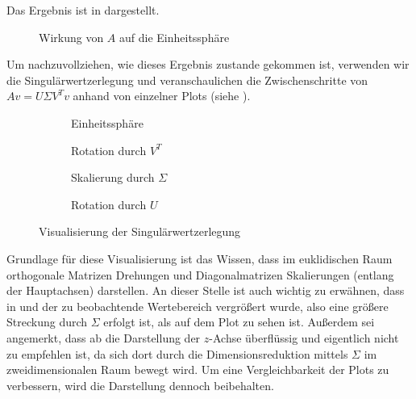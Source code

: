 Das Ergebnis ist in  dargestellt. 
\begin{figure}[htb]
    \centering
    \begin{subfigure}{0.45\textwidth}
        \centering
        
    \end{subfigure}
    \begin{subfigure}{0.45\textwidth}
        \centering
        
    \end{subfigure}
    \caption{Wirkung von \(A\) auf die Einheitssphäre}\label{fig:sph}
\end{figure}
Um nachzuvollziehen, wie dieses Ergebnis zustande gekommen ist, verwenden wir die Singulärwertzerlegung und veranschaulichen die Zwischenschritte von \(Av = U \Sigma V^{T}v\) anhand von einzelner Plots (siehe ). 
\begin{figure}[!b]
    \centering
    \captionsetup[subfigure]{justification=centering}
    \begin{subfigure}{0.45\textwidth}
        \centering
        \caption{Einheitssphäre}\label{fig:svspha}
        
    \end{subfigure}
    \begin{subfigure}{0.45\textwidth}
        \centering
        \caption{Rotation durch \(V^{T}\)}\label{fig:svsphb}
        
    \end{subfigure}
    \begin{subfigure}{0.45\textwidth}
        \centering
        \caption{Skalierung durch \(\Sigma\)}\label{fig:svdsphc}
        
    \end{subfigure}
    \begin{subfigure}{0.45\textwidth}
        \centering
        \caption{Rotation durch \(U\)}\label{fig:svdsphd}
        
    \end{subfigure}
    \caption{Visualisierung der Singulärwertzerlegung}\label{fig:svdsph}
\end{figure}

Grundlage für diese Visualisierung ist das Wissen, dass im euklidischen Raum orthogonale Matrizen Drehungen und Diagonalmatrizen Skalierungen (entlang der Hauptachsen) darstellen.
An dieser Stelle ist auch wichtig zu erwähnen, dass in  und  der zu beobachtende Wertebereich vergrößert wurde, also eine größere Streckung durch \(\Sigma\) erfolgt ist, als auf dem Plot zu sehen ist.
Außerdem sei angemerkt, dass ab  die Darstellung der \(z\)-Achse überflüssig und eigentlich nicht zu empfehlen ist, da sich dort durch die Dimensionsreduktion mittels \(\Sigma\) im zweidimensionalen Raum bewegt wird.
Um eine Vergleichbarkeit der Plots zu verbessern, wird die Darstellung dennoch beibehalten.  

